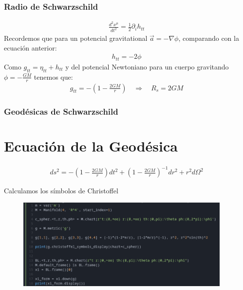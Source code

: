\documentclass{beamer}
\begin{document}


\begin{frame}
\frametitle{Radio de Schwarzschild}
\begin{gather*}
\frac{d ^2 x ^ {\mu} }{d t^2 } = \frac{1}{2} \partial _{i }  h _{tt }
\end{gather*}
Recordemos que para un potencial gravitational $ \vec a = -\nabla  \phi $, comparando con la ecuación anterior: 
\begin{gather*}
  h _{tt } = -2\phi 
\end{gather*}
Como $ g _{tt } = \eta _{tt } + h _{tt }  $ y del potencial Newtoniano para un cuerpo gravitando $ \phi = - \frac{GM }{r } $ tenemos que: 
\begin{gather*}
  g _{tt } = - \left(1 - \frac{2GM }{r }\right) \quad \Longrightarrow \quad R_s = 2GM
\end{gather*}
\end{frame}




\begin{frame}
\frametitle{Geodésicas de Schwarzschild}
\section{Ecuación de la Geodésica}

\begin{gather*}
  ds^2 = - \left(1 - \frac{2GM }{r }\right)dt^2 + \left(1 - \frac{2GM }{r}\right) ^ {-1 } dr^2 + r^2 d \Omega^2  
\end{gather*}

Calculamos los símbolos de Christoffel
\begin{figure}[H]
  \begin{center}
    \includegraphics[width=0.95\textwidth]{sage.png}
  \end{center}
\end{figure}
\end{frame}
\end{document}
